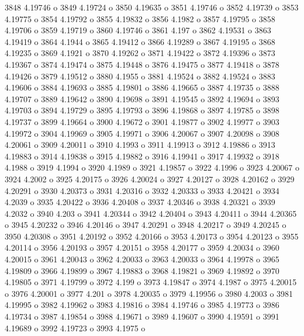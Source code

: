  3848  4.19746  o
 3849  4.19724  o
 3850  4.19635  o
 3851  4.19746  o
 3852  4.19739  o
 3853  4.19775  o
 3854  4.19792  o
 3855  4.19832  o
 3856  4.1982  o
 3857  4.19795  o
 3858  4.19706  o
 3859  4.19719  o
 3860  4.19746  o
 3861  4.197  o
 3862  4.19531  o
 3863  4.19419  o
 3864  4.1944  o
 3865  4.19412  o
 3866  4.19289  o
 3867  4.19195  o
 3868  4.19235  o
 3869  4.1921  o
 3870  4.19262  o
 3871  4.19422  o
 3872  4.19396  o
 3873  4.19367  o
 3874  4.19474  o
 3875  4.19448  o
 3876  4.19475  o
 3877  4.19418  o
 3878  4.19426  o
 3879  4.19512  o
 3880  4.1955  o
 3881  4.19524  o
 3882  4.19524  o
 3883  4.19606  o
 3884  4.19693  o
 3885  4.19801  o
 3886  4.19665  o
 3887  4.19735  o
 3888  4.19707  o
 3889  4.19642  o
 3890  4.19698  o
 3891  4.19545  o
 3892  4.19694  o
 3893  4.19703  o
 3894  4.19729  o
 3895  4.19793  o
 3896  4.19868  o
 3897  4.19785  o
 3898  4.19737  o
 3899  4.19664  o
 3900  4.19672  o
 3901  4.19877  o
 3902  4.19977  o
 3903  4.19972  o
 3904  4.19969  o
 3905  4.19971  o
 3906  4.20067  o
 3907  4.20098  o
 3908  4.20061  o
 3909  4.20011  o
 3910  4.1993  o
 3911  4.19913  o
 3912  4.19886  o
 3913  4.19883  o
 3914  4.19838  o
 3915  4.19882  o
 3916  4.19941  o
 3917  4.19932  o
 3918  4.1988  o
 3919  4.1994  o
 3920  4.1989  o
 3921  4.19857  o
 3922  4.1996  o
 3923  4.20067  o
 3924  4.2002  o
 3925  4.20175  o
 3926  4.20024  o
 3927  4.20127  o
 3928  4.20162  o
 3929  4.20291  o
 3930  4.20373  o
 3931  4.20316  o
 3932  4.20333  o
 3933  4.20421  o
 3934  4.2039  o
 3935  4.20422  o
 3936  4.20408  o
 3937  4.20346  o
 3938  4.20321  o
 3939  4.2032  o
 3940  4.203  o
 3941  4.20344  o
 3942  4.20404  o
 3943  4.20411  o
 3944  4.20365  o
 3945  4.20232  o
 3946  4.20146  o
 3947  4.20291  o
 3948  4.20217  o
 3949  4.20245  o
 3950  4.20308  o
 3951  4.20192  o
 3952  4.20166  o
 3953  4.20173  o
 3954  4.20123  o
 3955  4.20114  o
 3956  4.20193  o
 3957  4.20151  o
 3958  4.20177  o
 3959  4.20034  o
 3960  4.20015  o
 3961  4.20043  o
 3962  4.20033  o
 3963  4.20033  o
 3964  4.19978  o
 3965  4.19809  o
 3966  4.19899  o
 3967  4.19883  o
 3968  4.19821  o
 3969  4.19892  o
 3970  4.19805  o
 3971  4.19799  o
 3972  4.199  o
 3973  4.19847  o
 3974  4.1987  o
 3975  4.20015  o
 3976  4.20001  o
 3977  4.201  o
 3978  4.20035  o
 3979  4.19956  o
 3980  4.2003  o
 3981  4.19995  o
 3982  4.19962  o
 3983  4.19816  o
 3984  4.19746  o
 3985  4.19773  o
 3986  4.19734  o
 3987  4.19854  o
 3988  4.19671  o
 3989  4.19607  o
 3990  4.19591  o
 3991  4.19689  o
 3992  4.19723  o
 3993  4.1975  o
